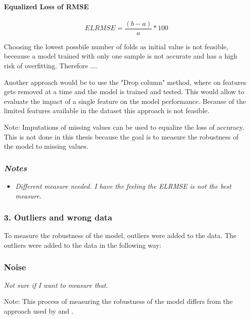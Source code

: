 \paragraph*{Equalized Loss of RMSE}
\begin{equation}
    \label{eq:qlrmse}
        ELRMSE = \frac{(b-a)}{a} * 100 %
\end{equation}

Choosing the lowest possbile number of folds as initial value is not feasible, beceause a model trained with only one sample is not accurate and has a high risk of overfitting.
Therefore ....

Another approach would be to use the "Drop column" method, where on features gets removed at a time and the model is trained and tested. This would allow to evaluate the impact of a single feature on the model performance. Because of the limited features available in the dataset this approach is not feasible.

Note: Imputations of missing values can be used to equalize the loss of accuracy. This is not done in this thesis because the goal is to measure the robustness of the model to missing values.

\subsubsection*{\textit{Notes}} 

\begin{itemize}
    \item \textit{Different measure needed. I have the feeling the ELRMSE is not the best measure.}
\end{itemize}

\subsubsection*{3. Outliers and wrong data}
To measure the robustness of the model, outliers were added to the data. The outliers were added to the data in the following way:


\subsubsection*{Noise}
\textit{Not sure if I want to measure that.}


Note: This process of measuring the robustness of the model differs from the approach used by \cite{siebert_constructionqualitymodel_} and \cite{saez_evaluatingclassifierbehavior_2016}.

